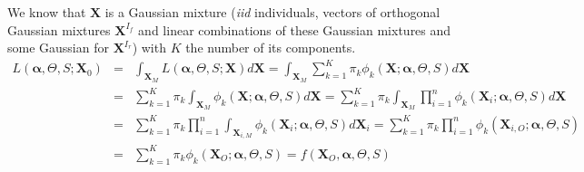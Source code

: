 \documentclass[11pt,a4paper]{report}
\begin{document}
%		

We know that $\boldsymbol{X}$ is a Gaussian mixture ({\it iid} individuals, vectors of orthogonal Gaussian mixtures $\boldsymbol{X}^{I_f}$ and linear combinations of these Gaussian mixtures and some Gaussian for $\boldsymbol{X}^{I_r}$) with $K$ the number of its components.
\begin{eqnarray}
	L(\boldsymbol{\alpha},\Theta,S;\boldsymbol{X}_0)&=&\int_{\boldsymbol{X}_M}L(\boldsymbol{\alpha},\Theta,S;\boldsymbol{X})d\boldsymbol{X} 
	=\int_{\boldsymbol{X}_M}\sum_{k=1}^K \pi_k \phi_k(\boldsymbol{X};\boldsymbol{\alpha},\Theta,S)d\boldsymbol{X} \\
	&=&\sum_{k=1}^K \pi_k \int_{\boldsymbol{X}_M}\phi_k(\boldsymbol{X};\boldsymbol{\alpha},\Theta,S)d\boldsymbol{X} 
	=\sum_{k=1}^K \pi_k \int_{\boldsymbol{X}_M}\prod_{i=1}^n\phi_k(\boldsymbol{X}_i;\boldsymbol{\alpha},\Theta,S)d\boldsymbol{X} \\
	&=&\sum_{k=1}^K \pi_k \prod_{i=1}^n\int_{\boldsymbol{X}_{i,M}}\phi_k(\boldsymbol{X}_i;\boldsymbol{\alpha},\Theta,S)d\boldsymbol{X}_i 
	=\sum_{k=1}^K \pi_k \prod_{i=1}^n\phi_k(\boldsymbol{X}_{i,O};\boldsymbol{\alpha},\Theta,S)\\
	&=&\sum_{k=1}^K \pi_k \phi_k(\boldsymbol{X}_{O};\boldsymbol{\alpha},\Theta,S)=f(\boldsymbol{X}_{O},\boldsymbol{\alpha},\Theta,S)
\end{eqnarray}
\end{document}
